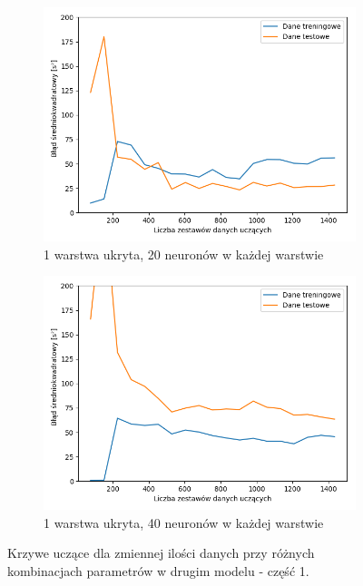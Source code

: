 \documentclass[12pt]{aghdpl}
\begin{document}
		\begin{figure}[h]
			\centering
			\begin{subfigure}{.8\linewidth}
		 		\includegraphics[width =\linewidth]{wykresy/3_drugi_model_tworzenie_i_analiza/learning_curves.png}
		 		\caption{1 warstwa ukryta, 20 neuronów w każdej warstwie}
		 	\end{subfigure}
		 	\begin{subfigure}{.8\linewidth}
		 		\includegraphics[width =\linewidth]{wykresy/4_zwiekszenie_stopnia_skomplikowania_modelu/1_warstwa_40_neuronow_learning_curves.png}
		 		\caption{1 warstwa ukryta, 40 neuronów w każdej warstwie}
		 	\end{subfigure}
		 	
		 	\caption{Krzywe uczące dla zmiennej ilości danych przy różnych kombinacjach parametrów w drugim modelu - część 1.}
			\label{fig: drugi_model_kombinacje_parametrow_learning_curves_1}
		\end{figure}
		
\end{document}
